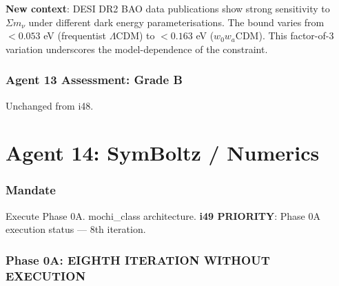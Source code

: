 \documentclass[11pt,a4paper]{article}
\begin{document}
\textbf{New context}: DESI DR2 BAO data publications show strong sensitivity to $\Sigma m_\nu$ under different dark energy parameterisations. The bound varies from $< 0.053$ eV (frequentist $\Lambda$CDM) to $< 0.163$ eV ($w_0 w_a$CDM). This factor-of-3 variation underscores the model-dependence of the constraint.

\section{Agent 13 Assessment: Grade B}

Unchanged from i48.


\part{Agent 14: SymBoltz / Numerics}
\label{part:agent14}

\section{Mandate}

Execute Phase 0A. mochi\_class architecture. \textbf{i49 PRIORITY}: Phase 0A execution status --- 8th iteration.

\section{Phase 0A: EIGHTH ITERATION WITHOUT EXECUTION}
\end{document}
